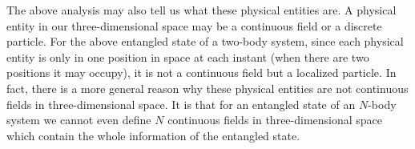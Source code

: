 

The above analysis may also tell us what these physical entities are. A physical entity in our three-dimensional space may be a continuous field or a discrete particle. For the above entangled state of a two-body system, since each physical entity is only in one position in space at each instant (when there are two positions it may occupy), it is not a continuous field but a localized particle.
In fact, there is a more general reason why these physical entities are not continuous fields in three-dimensional space.
It is that for an entangled state of an $N$-body system we cannot even define $N$ continuous fields in three-dimensional space which contain the whole information of the entangled state. %
 


